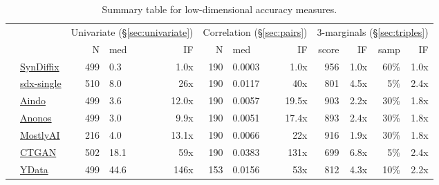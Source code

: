 \begin{table}
    \centering
    \caption{Summary table for low-dimensional accuracy measures.}
    \label{tab:accuracy}
    \small
    \begin{tabular}{llrlr@{\hskip 10pt}r@{\hskip 6pt}l@{\hskip 6pt}r@{\hskip 10pt}r@{\hskip 6pt}r@{\hskip 6pt}r@{\hskip 6pt}r}
        \toprule
          &   & \multicolumn{3}{c}{Univariate (\S\ref{sec:univariate})} & \multicolumn{3}{c}{Correlation (\S\ref{sec:pairs})} & \multicolumn{4}{c}{3-marginals (\S\ref{sec:triples})} \\
        
 & & N & med & IF & N & med & IF & score & IF & samp & IF \\
\midrule
        \cellcolor{blue} & \href{https://htmlpreview.github.io/?https://github.com/yoid2000/sdnist-summary/blob/main/results/syndiffix_all/report.html}{SynDiffix} & 499 & 0.3 & 1.0x & 190 & 0.0003 & 1.0x & 956 & 1.0x & 60\% & 1.0x \\
        \cellcolor{blue} & \href{https://htmlpreview.github.io/?https://github.com/yoid2000/sdnist-summary/blob/main/results/sdx-single/report.html}{sdx-single} & 510 & 8.0 & 26x & 190 & 0.0117 & 40x & 801 & 4.5x & 5\% & 2.4x \\
        \cellcolor{red} & \href{https://htmlpreview.github.io/?https://github.com/yoid2000/sdnist-summary/blob/main/results/aindo_synth/report.html}{Aindo} & 499 & 3.6 & 12.0x & 190 & 0.0057 & 19.5x & 903 & 2.2x & 30\% & 1.8x \\
        \cellcolor{red} & \href{https://htmlpreview.github.io/?https://github.com/yoid2000/sdnist-summary/blob/main/results/anonos_sdk/report.html}{Anonos} & 499 & 3.0 & 9.9x & 190 & 0.0051 & 17.4x & 893 & 2.4x & 30\% & 1.8x \\
        \cellcolor{red} & \href{https://htmlpreview.github.io/?https://github.com/yoid2000/sdnist-summary/blob/main/results/mostlyai_sd_platform/report.html}{MostlyAI} & 216 & 4.0 & 13.1x & 190 & 0.0066 & 22x & 916 & 1.9x & 30\% & 1.8x \\
        \cellcolor{red} & \href{https://htmlpreview.github.io/?https://github.com/yoid2000/sdnist-summary/blob/main/results/sdv_ctgan_epochs1000/report.html}{CTGAN} & 502 & 18.1 & 59x & 190 & 0.0383 & 131x & 699 & 6.8x & 5\% & 2.4x \\
        \cellcolor{pink} & \href{https://htmlpreview.github.io/?https://github.com/yoid2000/sdnist-summary/blob/main/results/ydata_fabric_synthesizers/report.html}{YData} & 499 & 44.6 & 146x & 153 & 0.0156 & 53x & 812 & 4.3x & 10\% & 2.2x \\

\end{tabular}
\end{table}
